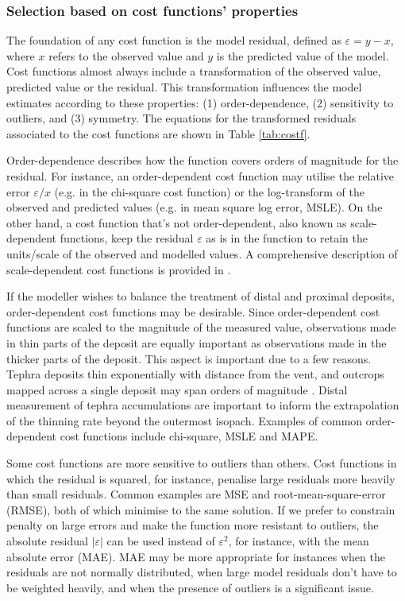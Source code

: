 \documentclass[a4paper,fleqn]{cas-sc}
\begin{document}
\subsubsection{Selection based on cost functions' properties} \label{subsection-met-prop}

    The foundation of any cost function is the model residual, defined as $\varepsilon = y - x$, where $x$ refers to the observed value and $y$ is the predicted value of the model. Cost functions almost always include a transformation of the observed value, predicted value or the residual. This transformation influences the model estimates according to these properties: (1) order-dependence, (2) sensitivity to outliers, and (3) symmetry. The equations for the transformed residuals associated to the cost functions are shown in Table \ref{tab:costf}.
    
    Order-dependence describes how the function covers orders of magnitude for the residual. For instance, an order-dependent cost function may utilise the relative error $\varepsilon / x$ (e.g. in the chi-square cost function) or the log-transform of the observed and predicted values (e.g. in mean square log error, MSLE). On the other hand, a cost function that's not order-dependent, also known as scale-dependent functions, keep the residual $\varepsilon$ as is in the function to retain the units/scale of the observed and modelled values. A comprehensive description of scale-dependent cost functions is provided in \cite{walther2005concepts}. 
    
    If the modeller wishes to balance the treatment of distal and proximal deposits, order-dependent cost functions may be desirable. Since order-dependent cost functions are scaled to the magnitude of the measured value, observations made in thin parts of the deposit are equally important as observations made in the thicker parts of the deposit. This aspect is important due to a few reasons. Tephra deposits thin exponentially with distance from the vent, and outcrops mapped across a single deposit may span orders of magnitude \citep{pyle1989thickness}. Distal measurement of tephra accumulations are important to inform the extrapolation of the thinning rate beyond the outermost isopach. Examples of common order-dependent cost functions include chi-square, MSLE and MAPE.
    
    Some cost functions are more sensitive to outliers than others. Cost functions in which the residual is squared, for instance, penalise large residuals more heavily than small residuals. Common examples are MSE and root-mean-square-error (RMSE), both of which minimise to the same solution. If we prefer to constrain penalty on large errors and make the function more resistant to outliers, the absolute residual $\left |\varepsilon \right |$ can be used instead of $\varepsilon^2$, for instance, with the mean absolute error (MAE). MAE may be more appropriate for instances when the residuals are not normally distributed, when large model residuals don't have to be weighted heavily, and when the presence of outliers is a significant issue. 
    
\end{document}
